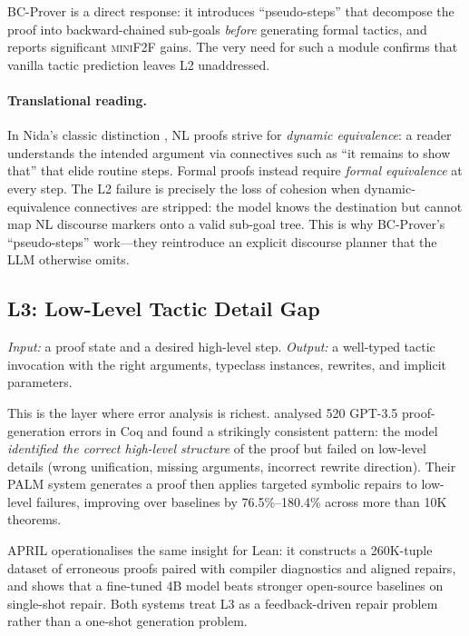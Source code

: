 \documentclass[11pt,letterpaper]{article}
\begin{document}
BC-Prover \cite{he2024bcprover} is a direct response: it introduces
``pseudo-steps'' that decompose the proof into backward-chained
sub-goals \emph{before} generating formal tactics, and reports
significant \textsc{miniF2F} gains. The very need for such a module
confirms that vanilla tactic prediction leaves L2 unaddressed.

\paragraph{Translational reading.}
In Nida's classic distinction \cite{nida1964science}, NL proofs strive
for \emph{dynamic equivalence}: a reader understands the intended
argument via connectives such as ``it remains to show that'' that elide
routine steps. Formal proofs instead require \emph{formal equivalence}
at every step. The L2 failure is precisely the loss of cohesion when
dynamic-equivalence connectives are stripped: the model knows the
destination but cannot map NL discourse markers onto a valid sub-goal
tree. This is why BC-Prover's ``pseudo-steps'' work---they reintroduce
an explicit discourse planner that the LLM otherwise omits.

\subsection{L3: Low-Level Tactic Detail Gap}
\label{sec:l3}

\emph{Input:} a proof state and a desired high-level step.
\emph{Output:} a well-typed tactic invocation with the right arguments,
typeclass instances, rewrites, and implicit parameters.

This is the layer where error analysis is richest.
\citet{lu2024palm} analysed 520 GPT-3.5 proof-generation errors in
Coq and found a strikingly consistent pattern: the model \emph{identified
the correct high-level structure} of the proof but failed on low-level
details (wrong unification, missing arguments, incorrect rewrite
direction). Their PALM system generates a proof then applies targeted
symbolic repairs to low-level failures, improving over baselines by
76.5\%--180.4\% across more than 10K theorems.

APRIL \cite{wang2026april} operationalises the same insight for Lean:
it constructs a 260K-tuple dataset of erroneous proofs paired with
compiler diagnostics and aligned repairs, and shows that a fine-tuned
4B model beats stronger open-source baselines on single-shot repair.
Both systems treat L3 as a feedback-driven repair problem rather than a
one-shot generation problem.
\end{document}
